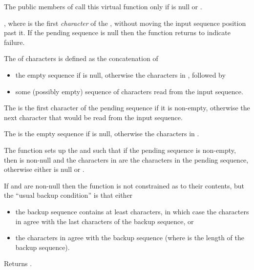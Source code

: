 \begin{itemdescr}
\pnum
\remarks
The public members of
call this virtual function only if
is null or
.

\pnum
\returns
{},
where  is the first
\textit{character}
of the
,
without moving the input sequence position past it.
If the pending sequence is null then the function returns
to indicate failure.

\pnum
The
of characters is defined as the concatenation of
\begin{itemize}
\item the empty sequence if  is null, otherwise the
characters in
,
followed by
\item
some (possibly empty) sequence of characters read from the input sequence.
\end{itemize}

\pnum
The
is
the first character of the pending sequence if it is non-empty,
otherwise
the next character that would be read from the input sequence.

\pnum
The
is the empty sequence if  is null, otherwise the
characters in
.

\pnum
\effects
The function sets up the
and
such that
if the pending sequence is non-empty, then
is non-null and
the characters in  are
the characters in the pending sequence,
otherwise
either 
is null or
.

\pnum
If
and
are non-null then the function is not constrained as to their contents, but the ``usual backup condition'' is that either
\begin{itemize}
\item
the backup sequence contains at least
characters, in which case the characters in
agree with the last
characters of the backup sequence, or
\item
the characters in 
agree with the backup sequence (where  is the length of the backup sequence).
\end{itemize}

\pnum
{}
Returns
.
\end{itemdescr}

